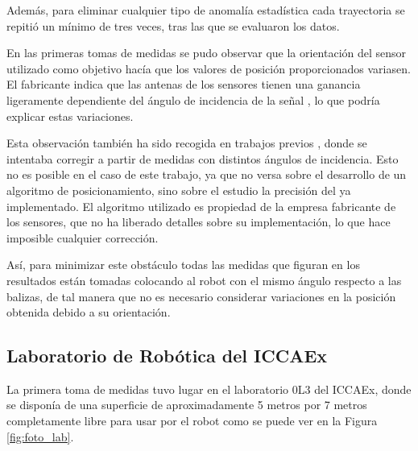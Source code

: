 Además, para eliminar cualquier tipo de anomalía estadística cada trayectoria se repitió un mínimo de tres veces, tras las que se evaluaron los datos.

En las primeras tomas de medidas se pudo observar que la orientación del sensor utilizado como objetivo hacía que los valores de posición proporcionados variasen.
El fabricante indica que las antenas de los sensores tienen una ganancia ligeramente dependiente del ángulo de incidencia de la señal \cite{ang}, lo que podría explicar estas variaciones.


Esta observación también ha sido recogida en trabajos previos \cite{MSTesis}, donde se intentaba corregir a partir de medidas con distintos ángulos de incidencia.
Esto no es posible en el caso de este trabajo, ya que no versa sobre el desarrollo de un algoritmo de posicionamiento, sino sobre el estudio la precisión del ya implementado.
El algoritmo utilizado es propiedad de la empresa fabricante de los sensores, que no ha liberado detalles sobre su implementación, lo que hace imposible cualquier corrección.

Así, para minimizar este obstáculo todas las medidas que figuran en los resultados están tomadas colocando al robot con el mismo ángulo respecto a las balizas, de tal manera que no es necesario considerar variaciones en la posición obtenida debido a su orientación.

\subsection{Laboratorio de Robótica del ICCAEx}

La primera toma de medidas tuvo lugar en el laboratorio 0L3 del ICCAEx, donde se disponía de una superficie de aproximadamente 5 metros por 7 metros completamente libre para usar por el robot como se puede ver en la Figura \ref{fig:foto_lab}.

